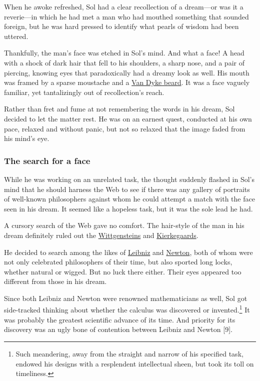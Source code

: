 \documentclass[
  12pt,
  british,
  a4paper,
]{article}
\begin{document}
When he awoke refreshed, Sol had a clear recollection of a dream---or
was it a reverie---in which he had met a man who had mouthed something
that sounded foreign, but he was hard pressed to identify what pearls of
wisdom had been uttered.

Thankfully, the man's face was etched in Sol's mind. And what a face! A
head with a shock of dark hair that fell to his shoulders, a sharp nose,
and a pair of piercing, knowing eyes that paradoxically had a dreamy
look as well. His mouth was framed by a sparse moustache and a
\href{https://en.wikipedia.org/wiki/Van_Dyke_beard}{Van Dyke beard}. It
was a face vaguely familiar, yet tantalizingly out of recollection's
reach.

Rather than fret and fume at not remembering the words in his dream, Sol
decided to let the matter rest. He was on an earnest quest, conducted at
his own pace, relaxed and without panic, but not so relaxed that the
image faded from his mind's eye. \emojifont🙂\normalfont

\hypertarget{the-search-for-a-face}{%
\subsubsection{The search for a face}\label{the-search-for-a-face}}

While he was working on an unrelated task, the thought suddenly flashed
in Sol's mind that he should harness the Web to see if there was any
gallery of portraits of well-known philosophers against whom he could
attempt a match with the face seen in his dream. It seemed like a
hopeless task, but it was the sole lead he had.

A cursory search of the Web gave no comfort. The hair-style of the man
in his dream definitely ruled out the
\href{https://tinyurl.com/y2sn8uzb}{Wittgensteins} and
\href{https://tinyurl.com/y3xdx3gl}{Kierkegaards}.

He decided to search among the likes of
\href{https://tinyurl.com/yxomtbt5}{Leibniz} and
\href{https://tinyurl.com/y5lc2fyx}{Newton}, both of whom were not only
celebrated philosophers of their time, but also sported long locks,
whether natural or wigged. But no luck there either. Their eyes appeared
too different from those in his dream.

Since both Leibniz and Newton were renowned mathematicians as well, Sol
got side-tracked thinking about whether the calculus was discovered or
invented.\footnote{Such meandering, away from the straight and narrow of
  his specified task, endowed his designs with a resplendent
  intellectual sheen, but took its toll on timeliness.} It was probably
the greatest scientific advance of its time. And priority for its
discovery was an ugly bone of contention between Leibniz and Newton
{[}9{]}.
\end{document}

